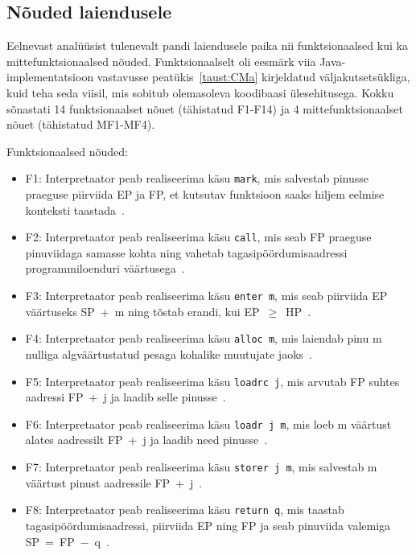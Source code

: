 \subsection{Nõuded laiendusele}\label{implementatsioon:nouded}

Eelnevast analüüsist tulenevalt pandi laiendusele paika nii funktsionaalsed kui ka mittefunktsionaalsed nõuded. Funktsionaalselt oli eesmärk viia Java-implementatsioon vastavusse peatükis~\ref{taust:CMa} kirjeldatud väljakutsetsükliga, kuid teha seda viisil, mis sobitub olemasoleva koodibaasi ülesehitusega. Kokku sõnastati 14 funktsionaalset nõuet (tähistatud F1-F14) ja 4 mittefunktsionaalset nõuet (tähistatud MF1-MF4).

Funktsionaalsed nõuded:

\begin{itemize}
	\item F1: Interpretaator peab realiseerima käsu \verb|mark|, mis salvestab pinusse praeguse piirviida EP ja FP, et kutsutav funktsioon saaks hiljem eelmise konteksti taastada~\cite{wilhelm_imperative_2010}.
	\item F2: Interpretaator peab realiseerima käsu \verb|call|, mis seab FP praeguse pinuviidaga samasse kohta ning vahetab tagasipöördumisaadressi programmiloenduri väärtusega~\cite{wilhelm_imperative_2010}.
	\item F3: Interpretaator peab realiseerima käsu \verb|enter m|, mis seab piirviida EP väärtuseks SP~+~m ning tõstab erandi, kui EP~$\geq$~HP~\cite{wilhelm_imperative_2010}.
	\item F4: Interpretaator peab realiseerima käsu \verb|alloc m|, mis laiendab pinu m nulliga algväärtustatud pesaga kohalike muutujate jaoks~\cite{wilhelm_imperative_2010}.
	\item F5: Interpretaator peab realiseerima käsu \verb|loadrc j|, mis arvutab FP suhtes aadressi FP~+~j ja laadib selle pinusse~\cite{wilhelm_imperative_2010}.
	\item F6: Interpretaator peab realiseerima käsu \verb|loadr j m|, mis loeb m väärtust alates aadressilt FP~+~j ja laadib need pinusse~\cite{wilhelm_imperative_2010}.
	\item F7: Interpretaator peab realiseerima käsu \verb|storer j m|, mis salvestab m väärtust pinust aadressile FP~+~j~\cite{wilhelm_imperative_2010}.
	\item F8: Interpretaator peab realiseerima käsu \verb|return q|, mis taastab tagasipöördumisaadressi, piirviida EP ning FP ja seab pinuviida valemiga SP~=~FP~$-$~q~\cite{wilhelm_imperative_2010}.

\end{itemize}

